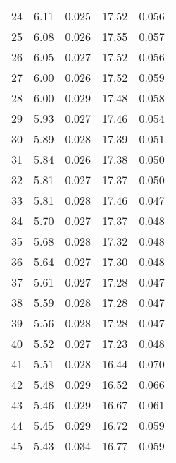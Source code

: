 \begin{table}
\begin{tabular}{c|ll|ll}
24 & 6.11 & 0.025 & 17.52 & 0.056 \\
25 & 6.08 & 0.026 & 17.55 & 0.057 \\
26 & 6.05 & 0.027 & 17.52 & 0.056 \\
27 & 6.00 & 0.026 & 17.52 & 0.059 \\
28 & 6.00 & 0.029 & 17.48 & 0.058 \\
29 & 5.93 & 0.027 & 17.46 & 0.054 \\
30 & 5.89 & 0.028 & 17.39 & 0.051 \\
31 & 5.84 & 0.026 & 17.38 & 0.050 \\
32 & 5.81 & 0.027 & 17.37 & 0.050 \\
33 & 5.81 & 0.028 & 17.46 & 0.047 \\
34 & 5.70 & 0.027 & 17.37 & 0.048 \\
35 & 5.68 & 0.028 & 17.32 & 0.048 \\
36 & 5.64 & 0.027 & 17.30 & 0.048 \\
37 & 5.61 & 0.027 & 17.28 & 0.047 \\
38 & 5.59 & 0.028 & 17.28 & 0.047 \\
39 & 5.56 & 0.028 & 17.28 & 0.047 \\
40 & 5.52 & 0.027 & 17.23 & 0.048 \\
41 & 5.51 & 0.028 & 16.44 & 0.070 \\
42 & 5.48 & 0.029 & 16.52 & 0.066 \\
43 & 5.46 & 0.029 & 16.67 & 0.061 \\
44 & 5.45 & 0.029 & 16.72 & 0.059 \\
45 & 5.43 & 0.034 & 16.77 & 0.059 \\
               \hline
        \end{tabular}
    \end{table}
    \clearpage

